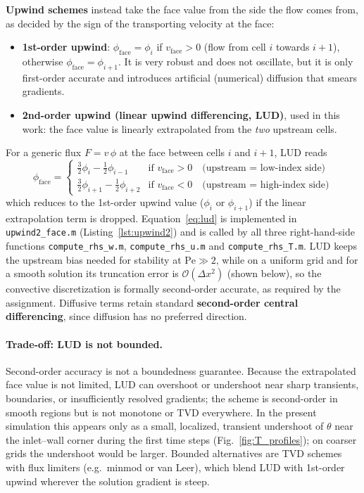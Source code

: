 \documentclass[12pt,a4paper]{article}
\begin{document}
\textbf{Upwind schemes} instead take the face value from the side the flow comes from, as
decided by the sign of the transporting velocity at the face:
\begin{itemize}
    \item \textbf{1st-order upwind}: $\phi_{\text{face}}=\phi_i$ if $v_{\text{face}}>0$ (flow
          from cell $i$ towards $i+1$), otherwise $\phi_{\text{face}}=\phi_{i+1}$. It is very
          robust and does not oscillate, but it is only first-order accurate and introduces
          artificial (numerical) diffusion that smears gradients.
    \item \textbf{2nd-order upwind (linear upwind differencing, LUD)}, used in this work: the
          face value is linearly extrapolated from the \emph{two} upstream cells.
\end{itemize}
For a generic flux $F = v\,\phi$ at the face between cells $i$ and $i+1$, LUD reads
\begin{equation}
    \phi_{\text{face}} =
    \begin{cases}
        \tfrac{3}{2}\phi_i - \tfrac{1}{2}\phi_{i-1} & \text{if } v_{\text{face}} > 0
            \quad\text{(upstream = low-index side)} \\[4pt]
        \tfrac{3}{2}\phi_{i+1} - \tfrac{1}{2}\phi_{i+2} & \text{if } v_{\text{face}} < 0
            \quad\text{(upstream = high-index side)}
    \end{cases}
    \label{eq:lud}
\end{equation}
which reduces to the 1st-order upwind value ($\phi_i$ or $\phi_{i+1}$) if the linear
extrapolation term is dropped. Equation~\eqref{eq:lud} is implemented in
\texttt{upwind2\_face.m} (Listing~\ref{lst:upwind2}) and is called by all three right-hand-side
functions \texttt{compute\_rhs\_w.m}, \texttt{compute\_rhs\_u.m} and \texttt{compute\_rhs\_T.m}.
LUD keeps the upstream bias needed for stability at $\text{Pe}\gg2$, while on a uniform grid and
for a smooth solution its truncation error is $\mathcal{O}(\Delta x^2)$ (shown below), so the
convective discretization is formally second-order accurate, as required by the assignment.
Diffusive terms retain standard \textbf{second-order central differencing}, since diffusion has
no preferred direction.

\paragraph{Trade-off: LUD is not bounded.} Second-order accuracy is not a boundedness guarantee.
Because the extrapolated face value is not limited, LUD can overshoot or undershoot near sharp
transients, boundaries, or insufficiently resolved gradients; the scheme is second-order in
smooth regions but is not monotone or TVD everywhere. In the present simulation this appears
only as a small, localized, transient undershoot of $\theta$ near the inlet--wall corner during
the first time steps (Fig.~\ref{fig:T_profiles}); on coarser grids the undershoot would be
larger. Bounded alternatives are TVD schemes with flux limiters (e.g.\ minmod or van Leer),
which blend LUD with 1st-order upwind wherever the solution gradient is steep.
\end{document}
